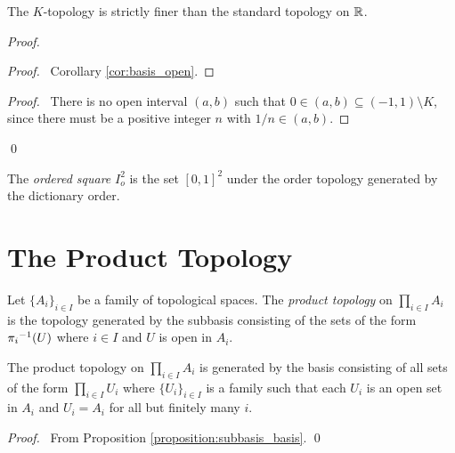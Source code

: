 \begin{lemma}
    The $K$-topology is strictly finer than the standard topology on $\mathbb{R}$.
\end{lemma}

\begin{proof}
    \pf
    \begin{proof}
        \pf\ Corollary \ref{cor:basis_open}.
    \end{proof}
    \begin{proof}
        \pf\ There is no open interval $(a,b)$ such that $0 \in (a,b) \subseteq (-1,1) \setminus K$, since
        there must be a positive integer $n$ with $1/n \in (a,b)$.
    \end{proof}
    \qed
\end{proof}

\begin{definition}
    The \emph{ordered square} $I_o^2$ is the set $[0,1]^2$ under the order topology generated by the
    dictionary order.
\end{definition}

\section{The Product Topology}

\begin{definition}
    Let $\{ A_i \}_{i \in I}$ be a family of topological spaces. The \emph{product topology} on $\prod_{i \in I} A_i$
    is the topology generated by the subbasis consisting of the sets of the form ${\pi_i}^{-1}(U)$ where $i \in I$
    and $U$ is open in $A_i$.
\end{definition}

\begin{proposition}
    \label{proposition:product_basis}
    The product topology on $\prod_{i \in I} A_i$ is generated by the basis consisting of all sets of the form $\prod_{i \in I} U_i$
    where $\{ U_i \}_{i \in I}$ is a family such that each $U_i$ is an open set in $A_i$ and $U_i = A_i$ for all but finitely many $i$.
\end{proposition}

\begin{proof}
    \pf\ From Proposition \ref{proposition:subbasis_basis}. \qed
\end{proof}

